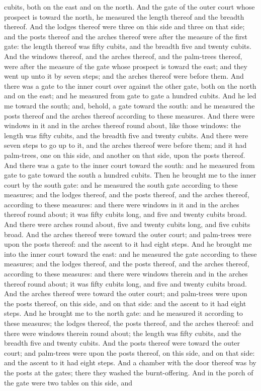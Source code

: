 cubits, both on the east and on the north.  And the gate of the outer court whose prospect is toward the north, he measured the length thereof and the breadth thereof. And the lodges thereof were three on this side and three on that side; and the posts thereof and the arches thereof were after the measure of the first gate: the length thereof was fifty cubits, and the breadth five and twenty cubits. And the windows thereof, and the arches thereof, and the palm-trees thereof, were after the measure of the gate whose prospect is toward the east; and they went up unto it by seven steps; and the arches thereof were before them. And there was a gate to the inner court over against the other gate, both on the north and on the east; and he measured from gate to gate a hundred cubits.  And he led me toward the south; and, behold, a gate toward the south: and he measured the posts thereof and the arches thereof according to these measures. And there were windows in it and in the arches thereof round about, like those windows: the length was fifty cubits, and the breadth five and twenty cubits. And there were seven steps to go up to it, and the arches thereof were before them; and it had palm-trees, one on this side, and another on that side, upon the posts thereof. And there was a gate to the inner court toward the south: and he measured from gate to gate toward the south a hundred cubits.  Then he brought me to the inner court by the south gate: and he measured the south gate according to these measures; and the lodges thereof, and the posts thereof, and the arches thereof, according to these measures: and there were windows in it and in the arches thereof round about; it was fifty cubits long, and five and twenty cubits broad. And there were arches round about, five and twenty cubits long, and five cubits broad. And the arches thereof were toward the outer court; and palm-trees were upon the posts thereof: and the ascent to it had eight steps.  And he brought me into the inner court toward the east: and he measured the gate according to these measures; and the lodges thereof, and the posts thereof, and the arches thereof, according to these measures: and there were windows therein and in the arches thereof round about; it was fifty cubits long, and five and twenty cubits broad. And the arches thereof were toward the outer court; and palm-trees were upon the posts thereof, on this side, and on that side: and the ascent to it had eight steps.  And he brought me to the north gate: and he measured it according to these measures; the lodges thereof, the posts thereof, and the arches thereof: and there were windows therein round about; the length was fifty cubits, and the breadth five and twenty cubits. And the posts thereof were toward the outer court; and palm-trees were upon the posts thereof, on this side, and on that side: and the ascent to it had eight steps.  And a chamber with the door thereof was by the posts at the gates; there they washed the burnt-offering. And in the porch of the gate were two tables on this side, and 